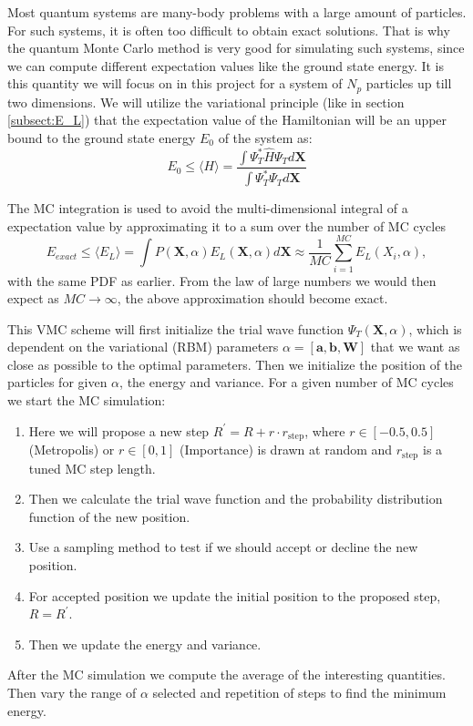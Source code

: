 \documentclass[12pt,a4paper,english]{article}
\begin{document}
Most quantum systems are many-body problems with a large amount of particles. For such systems, it is often too difficult to obtain exact solutions. That is why the quantum Monte Carlo method is very good for simulating such systems, since we can compute different expectation values like the ground state energy. It is this quantity we will focus on in this project for a system of $N_p$ particles up till two dimensions. We will utilize the variational principle (like in section \ref{subsect:E_L}) that the expectation value of the Hamiltonian will be an upper bound to the ground state energy $E_0$ of the system as:
\begin{equation}
\label{eq:variational_prin}
E_0\leq \langle H\rangle=\frac{\int\Psi_T^*\hat{H}\Psi_Td\textbf{X}}{\int\Psi_T^*\Psi_T d\textbf{X}}
\end{equation}

The MC integration is used to avoid the multi-dimensional integral of a expectation value by approximating it to a sum over the number of MC cycles
\begin{equation}
\label{eq:EL_expect_var}
E_{exact}\leq\langle E_L \rangle=\int P(\textbf{X}, \alpha)E_L(\textbf{X}, \alpha)d\textbf{X}\approx \frac{1}{MC}\sum_{i=1}^{MC}E_L(X_i, \alpha),
\end{equation}
with the same PDF as earlier. From the law of large numbers we would then expect as $MC\rightarrow\infty$, the above approximation should become exact. 

This VMC scheme will first initialize the trial wave function $\Psi_T(\textbf{X},\alpha)$, which is dependent on the variational (RBM) parameters $\alpha=[\textbf{a},\textbf{b},\textbf{W}]$ that we want as close as possible to the optimal parameters. Then we initialize the position of the particles for given $\alpha$, the energy and variance. For a given number of MC cycles we start the MC simulation:
\begin{enumerate}
	\item Here we will propose a new step $R^{\prime}=R+r\cdot r_{\text{step}}$, where $r\in[-0.5,0.5]$ (Metropolis) or $r\in[0,1]$ (Importance) is drawn at random and $r_{\text{step}}$ is a tuned MC step length. 
	\item Then we calculate the trial wave function and the probability distribution function of the new position.
	\item Use a sampling method to test if we should accept or decline the new position.
	\item For accepted position we update the initial position to the proposed step, $R=R^{\prime}$.
	\item Then we update the energy and variance.
\end{enumerate} 
After the MC simulation we compute the average of the interesting quantities. Then vary the range of $\alpha$ selected and repetition of steps to find the minimum energy.
\end{document}
